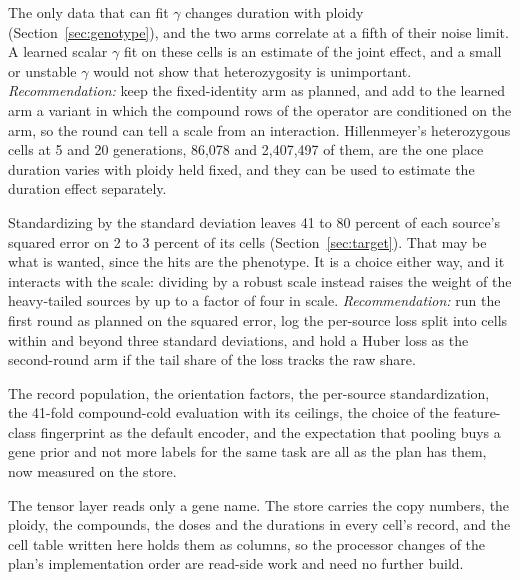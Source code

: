 The only data that can fit $\gamma$ changes duration with ploidy
(Section~\ref{sec:genotype}), and the two arms correlate at a fifth of their noise limit.
A learned scalar $\gamma$ fit on these cells is an estimate of the joint effect, and a
small or unstable $\gamma$ would not show that heterozygosity is unimportant.
\textit{Recommendation:} keep the fixed-identity arm as planned, and add to the learned arm
a variant in which the compound rows of the operator are conditioned on the arm, so the
round can tell a scale from an interaction. Hillenmeyer's heterozygous cells at 5 and 20
generations, 86{,}078 and 2{,}407{,}497 of them, are the one place duration varies with
ploidy held fixed, and they can be used to estimate the duration effect separately.

Standardizing by the standard deviation leaves 41 to 80 percent of each source's squared
error on 2 to 3 percent of its cells (Section~\ref{sec:target}). That may be what is
wanted, since the hits are the phenotype. It is a choice either way, and it interacts with
the scale: dividing by a robust scale instead raises the weight of the heavy-tailed sources
by up to a factor of four in scale. \textit{Recommendation:} run the first round as planned
on the squared error, log the per-source loss split into cells within and beyond three
standard deviations, and hold a Huber loss as the second-round arm if the tail share of
the loss tracks the raw share.

The record population, the orientation factors, the per-source standardization, the
41-fold compound-cold evaluation with its ceilings, the choice of the feature-class
fingerprint as the default encoder, and the expectation that pooling buys a gene prior and
not more labels for the same task are all as the plan has them, now measured on the store.

The tensor layer reads only a gene name. The store carries the copy numbers, the ploidy,
the compounds, the doses and the durations in every cell's record, and the cell table
written here holds them as columns, so the processor changes of the plan's implementation
order are read-side work and need no further build.

